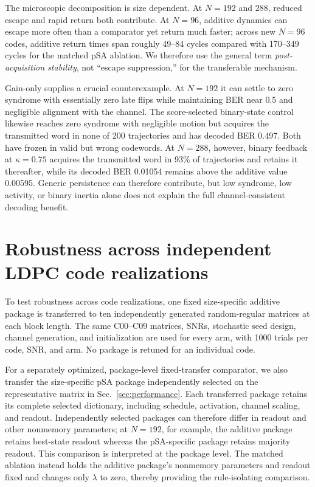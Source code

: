\documentclass[aps,prapplied,reprint,superscriptaddress,longbibliography,floatfix]{revtex4-2}
\newcommand{\psa}{pSA}
\begin{document}
The microscopic decomposition is size dependent.  At $N=192$ and 288, reduced escape and rapid return both contribute.  At $N=96$, additive dynamics can escape more often than a comparator yet return much faster; across new $N=96$ codes, additive return times span roughly 49--84 cycles compared with 170--349 cycles for the matched \psa{} ablation.  We therefore use the general term \emph{post-acquisition stability}, not ``escape suppression,'' for the transferable mechanism.

Gain-only supplies a crucial counterexample.  At $N=192$ it can settle to zero syndrome with essentially zero late flips while maintaining BER near 0.5 and negligible alignment with the channel.  The score-selected binary-state control likewise reaches zero syndrome with negligible motion but acquires the transmitted word in none of 200 trajectories and has decoded BER 0.497.  Both have frozen in valid but wrong codewords.  At $N=288$, however, binary feedback at $\kappa=0.75$ acquires the transmitted word in 93\% of trajectories and retains it thereafter, while its decoded BER 0.01054 remains above the additive value 0.00595.  Generic persistence can therefore contribute, but low syndrome, low activity, or binary inertia alone does not explain the full channel-consistent decoding benefit.

\section{Robustness across independent LDPC code realizations}
\label{sec:robustness}

To test robustness across code realizations, one fixed size-specific additive package is transferred to ten independently generated random-regular matrices at each block length.  The same C00--C09 matrices, SNRs, stochastic seed design, channel generation, and initialization are used for every arm, with 1000 trials per code, SNR, and arm.  No package is retuned for an individual code.

For a separately optimized, package-level fixed-transfer comparator, we also transfer the size-specific \psa{} package independently selected on the representative matrix in Sec.~\ref{sec:performance}.  Each transferred package retains its complete selected dictionary, including schedule, activation, channel scaling, and readout.  Independently selected packages can therefore differ in readout and other nonmemory parameters; at $N=192$, for example, the additive package retains best-state readout whereas the pSA-specific package retains majority readout.  This comparison is interpreted at the package level.  The matched ablation instead holds the additive package's nonmemory parameters and readout fixed and changes only $\lambda$ to zero, thereby providing the rule-isolating comparison.
\end{document}
